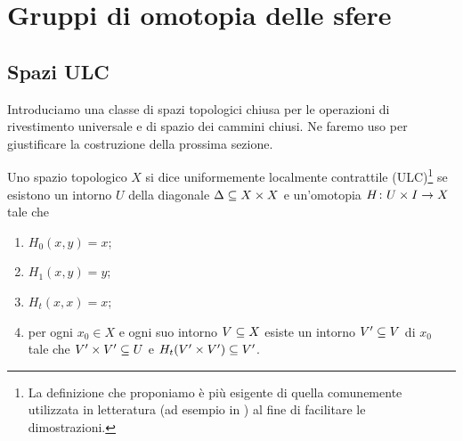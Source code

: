 \chapter{Gruppi di omotopia delle sfere}

\section{Spazi ULC}

Introduciamo una classe di spazi topologici chiusa per le operazioni di rivestimento universale e di spazio dei cammini chiusi. Ne faremo uso per giustificare la costruzione della prossima sezione.

\begin{definition}
Uno spazio topologico $X$ si dice uniformemente localmente contrattile (ULC)\footnote{La definizione che proponiamo è più esigente di quella comunemente utilizzata in letteratura (ad esempio in ) al fine di facilitare le dimostrazioni.} se esistono un intorno $U$ della diagonale $\Delta\subseteq X\times X$ e un'omotopia $H\colon U\times I\to X$ tale che
\begin{enumerate}
\item\label{ULC:pr1} $H_0(x,y)=x$;
\item\label{ULC:pr2} $H_1(x,y)=y$;
\item\label{ULC:pr3} $H_t(x,x)=x$;
\item\label{ULC:pr4} per ogni $x_0\in X$ e ogni suo intorno $V\subseteq X$ esiste un intorno $V'\subseteq V$ di $x_0$ tale che $V'\times V'\subseteq U$ e $H_t(V'\times V')\subseteq V'$.
\end{enumerate}
\end{definition}

